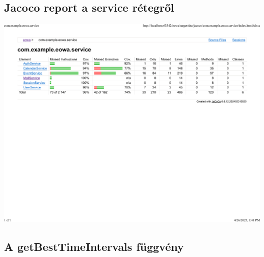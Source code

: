\documentclass[a4paper,12pt]{report}
\theoremstyle{definition}
\theoremstyle{remark}
\begin{document}
\subsection{Jacoco report a service rétegről}
\label{jacocoservice}
\begin{center}
\includegraphics[width=170mm]{jacoco_service.pdf}

\end{center}

\newpage

\subsection{A getBestTimeIntervals függvény}
\label{getBestDocumentation}
\end{document}
